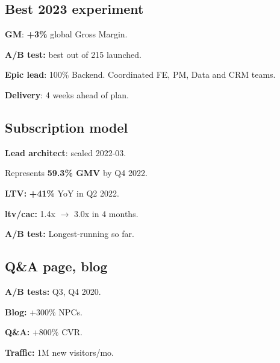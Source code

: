 \documentclass[a4paper]{MagicalCV}
\begin{document}
\lastupdated


\begin{minipage}[t]{0.33\textwidth}

\sectionsep
\subsection{Best 2023 experiment}
\begin{tightemize}
\item {\bf GM}: {\bf +3\% } global Gross Margin.
\item {\bf A/B test:} best out of 215 launched.
\item {\bf Epic lead}: 100\% Backend. Coordinated FE, PM, Data and CRM teams.
\item {\bf Delivery}: 4 weeks ahead of plan.

\end{tightemize}
\sectionsep

\subsection{Subscription model}
\begin{tightemize}
\item {\bf Lead architect}: scaled 2022-03.
\item Represents {\bf 59.3\% GMV} by Q4 2022.
\item {\bf LTV: } {\bf +41\% } YoY in Q2 2022.
\item {\bf ltv/cac: } 1.4x $\rightarrow$ 3.0x in 4 months.
\item {\bf A/B test: } Longest-running so far.
\end{tightemize}
\sectionsep

\subsection{Q\&A page, blog}
\begin{tightemize}
\item {\bf A/B tests: } Q3, Q4 2020.
\item {\bf Blog: } +300\% NPCs.
\item {\bf Q\&A: } +800\% CVR.
\item {\bf Traffic: } 1M new visitors/mo.
\end{tightemize}
\sectionsep


\end{minipage}
\end{document}
